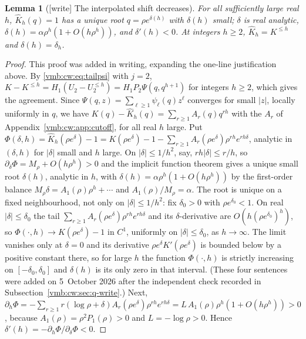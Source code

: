 \documentclass[11pt,a4paper]{article}
\numberwithin{equation}{section}
\newtheorem{lemma}[theorem]{Lemma}
\theoremstyle{definition}\newtheorem{definition}[theorem]{Definition}
\theoremstyle{remark}\newtheorem{remark}[theorem]{Remark}
\begin{document}
\begin{lemma}[{[write]} The interpolated shift decreases]\label{vmb:cw:lem:deltamono}
For all sufficiently large real $h$, $\widehat K_h(q)=1$ has a unique root
$q=\rho e^{\delta(h)}$ with $\delta(h)$ small; $\delta$ is real analytic,
$\delta(h)=\alpha\rho^h(1+O(h\rho^h))$, and $\delta'(h)<0$. At integers
$h\ge2$, $\widehat K_h=K^{\le h}$ and $\delta(h)=\delta_h$.
\end{lemma}
\begin{proof}
This proof was added in writing, expanding the one-line justification
above. By \eqref{vmb:cw:eq:tailpsi} with $j=2$, $K-K^{\le h}=H_1(U_2-U_2^{\le h})
=H_1P_2\Psi(q,q^{h+1})$ for integers $h\ge2$, which gives the agreement.
Since $\Psi(q,z)=\sum_{\ell\ge1}\psi_\ell(q)z^\ell$ converges for small $|z|$,
locally uniformly in $q$, we have
$K(q)-\widehat K_h(q)=\sum_{r\ge1}A_r(q)q^{rh}$ with the $A_r$ of
Appendix~\ref{vmb:cw:app:cutoff}, for all real $h$ large. Put
$\Phi(\delta,h)=\widehat K_h(\rho e^\delta)-1
=K(\rho e^\delta)-1-\sum_{r\ge1}A_r(\rho e^\delta)\rho^{rh}e^{rh\delta}$,
analytic in $(\delta,h)$ for $|\delta|$ small and $h$ large. On
$|\delta|\le1/h^2$, say, $rh|\delta|\le r/h$, so
$\partial_\delta\Phi=M_\rho+O(h\rho^h)>0$ and the implicit function theorem
gives a unique small root $\delta(h)$, analytic in $h$, with
$\delta(h)=\alpha\rho^h(1+O(h\rho^h))$ by the first-order balance
$M_\rho\delta=A_1(\rho)\rho^h+\cdots$ and $A_1(\rho)/M_\rho=\alpha$.
The root is unique on a fixed neighbourhood, not only on $|\delta|\le1/h^2$:
fix $\delta_0>0$ with $\rho e^{\delta_0}<1$. On real $|\delta|\le\delta_0$
the tail $\sum_{r\ge1}A_r(\rho e^\delta)\rho^{rh}e^{rh\delta}$ and its
$\delta$-derivative are $O(h(\rho e^{\delta_0})^h)$, so
$\Phi(\cdot,h)\to K(\rho e^\delta)-1$ in $C^1$, uniformly on
$|\delta|\le\delta_0$, as $h\to\infty$. The limit vanishes only at $\delta=0$
and its derivative $\rho e^\delta K'(\rho e^\delta)$ is bounded below by a
positive constant there, so for large $h$ the function $\Phi(\cdot,h)$ is
strictly increasing on $[-\delta_0,\delta_0]$ and $\delta(h)$ is its only
zero in that interval. (These four sentences were added on 5~October 2026
after the independent check recorded in
Subsection~\ref{vmb:cw:sec:q-write}.) Next,
$\partial_h\Phi=-\sum_{r\ge1}r(\log\rho+\delta)A_r(\rho e^\delta)
\rho^{rh}e^{rh\delta}=L\,A_1(\rho)\rho^h(1+O(h\rho^h))>0$, because
$A_1(\rho)=\rho^2P_1(\rho)>0$ and $L=-\log\rho>0$. Hence
$\delta'(h)=-\partial_h\Phi/\partial_\delta\Phi<0$.
\end{proof}
\end{document}
